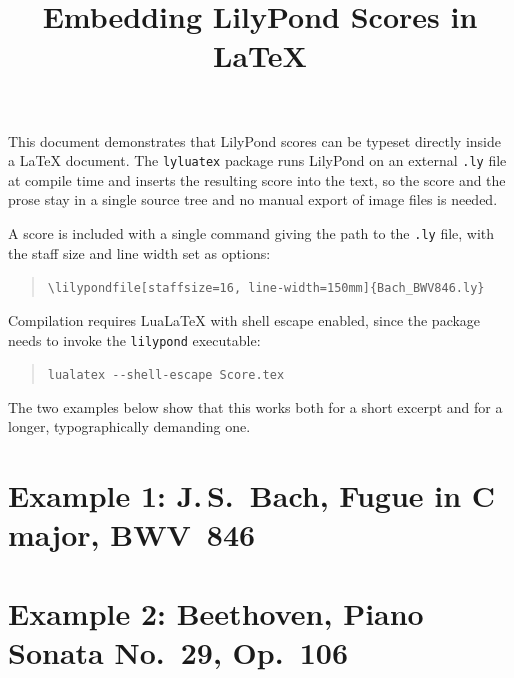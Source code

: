 \documentclass[a4paper,11pt]{ltjsarticle}
\title{Embedding LilyPond Scores in \LaTeX}
\date{}
\begin{document}
\maketitle

This document demonstrates that LilyPond scores can be typeset directly inside
a \LaTeX{} document. The \texttt{lyluatex} package runs LilyPond on an external
\texttt{.ly} file at compile time and inserts the resulting score into the text,
so the score and the prose stay in a single source tree and no manual export of
image files is needed.

A score is included with a single command giving the path to the \texttt{.ly}
file, with the staff size and line width set as options:

\begin{quote}
\texttt{\textbackslash lilypondfile[staffsize=16, line-width=150mm]\{Bach\_BWV846.ly\}}
\end{quote}

Compilation requires LuaLaTeX with shell escape enabled, since the package needs
to invoke the \texttt{lilypond} executable:

\begin{quote}
\texttt{lualatex -{}-shell-escape Score.tex}
\end{quote}

The two examples below show that this works both for a short excerpt and for a
longer, typographically demanding one.

\section{Example 1: J.\,S.~Bach, Fugue in C major, BWV~846}


\section{Example 2: Beethoven, Piano Sonata No.~29, Op.~106}

\end{document}
